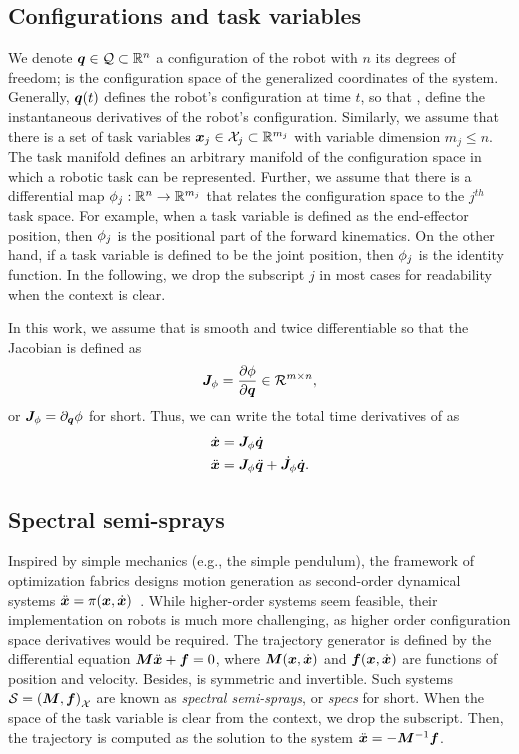 \subsection{Configurations and task variables}%
\label{sub:configurations_and_task_variables}

We denote $\bm{q}\in\mathcal{Q}\subset\mathbb{R}^n$ a
configuration of the robot with $n$ its degrees of freedom; \Q{} is the configuration space of the generalized coordinates
of the system. Generally, $\bm{q}(t)$ defines the robot's configuration at time $t$, so that 
\qdot, \qddot{} define the instantaneous derivatives of the robot's configuration.
Similarly, we assume
that there is a set of task variables $\bm{x}_j\in\mathcal{X}_j\subset\mathbb{R}^{m_j}$ with variable dimension
$m_j \leq n$. The task manifold \Xj{} defines an arbitrary manifold of the configuration
space \Q{} in which a robotic task can be represented. 
Further, we assume that there is a differential map
$\phi_j:\mathbb{R}^n\rightarrow\mathbb{R}^{m_j}$ that relates the configuration space to the $j^{th}$ task
space. For example, when a task variable is defined as the end-effector position, then
$\phi_j$ is the positional part of the forward kinematics. On the other hand, if a task
variable is defined to be the joint position, then $\phi_j$ is the identity function. 
In the following, we drop the subscript $j$ in most cases for readability when the
context is clear.

In this work, we assume that \map{} is smooth and twice differentiable so that the Jacobian is
defined as
\begin{equation}
  \bm{J}_{\phi} = \frac{\partial\phi}{\partial\bm{q}} \in \mathcal{R}^{m\times n}, 
\end{equation}
or $\bm{J}_{\phi} = \partial_{\bm{q}}\phi$ for short.
Thus, we can write the total time derivatives of \x{} as
\begin{align}
  \dot{\bm{x}} &= \bm{J}_{\phi}\dot{\bm{q}} \\
  \ddot{\bm{x}} &= \bm{J}_{\phi}\ddot{\bm{q}} + \dot{\bm{J}}_{\phi}\dot{\bm{q}}.
\end{align}

\subsection{Spectral semi-sprays}%
\label{sub:spectral_semi_sprays}

Inspired by simple mechanics (e.g., the simple pendulum), the framework of optimization
fabrics designs motion generation as second-order dynamical
systems $\ddot{\bm{x}} = \pi(\bm{x},\dot{\bm{x}})$~\cite{Cheng2020,Ratliff2020}. While higher-order systems seem feasible, their
implementation on robots is much more challenging, as higher order configuration space
derivatives would be required. The trajectory generator is defined by the differential equation
$\bm{M}\ddot{\bm{x}} + \bm{f} = 0$, where $\bm{M}(\bm{x},\dot{\bm{x}})$ and $\bm{f}(\bm{x},\dot{\bm{x}})$ are functions of position and
velocity. Besides, \M{} is symmetric and invertible. Such systems $\mathcal{S} = \left(\bm{M},\bm{f}\right)_{\mathcal{X}}$ are
known as \textit{spectral semi-sprays}, or \textit{specs} for short.  When the space of
the task variable is clear from the context, we drop the subscript.  Then, the trajectory
is computed as the solution to the system $\ddot{\bm{x}}=-\bm{M}^{-1}\bm{f}$.

